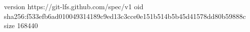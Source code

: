 version https://git-lfs.github.com/spec/v1
oid sha256:f533efb6ad010049314189c9ed13c3cce0e151b514b5b45d41578dd80b59888c
size 168440
